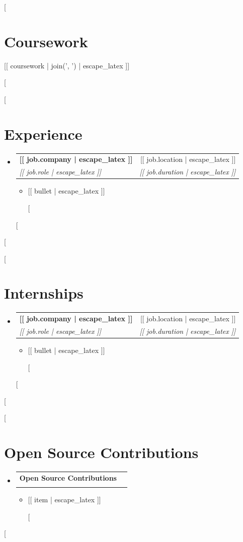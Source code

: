 \documentclass[letterpaper,11pt]{article}
\makeatletter
\newcommand{\resumeItemPlain}[1]{
  \item\small{#1 \vspace{-2pt}}
}
\newcommand{\resumeSubheading}[4]{
  \vspace{-1pt}\item
    \begin{tabular*}{0.97\textwidth}{l@{\extracolsep{\fill}}r}
      \textbf{#1} & #2 \\
      \textit{\small#3} & \textit{\small #4} \\
    \end{tabular*}\vspace{-5pt}
}
\newcommand{\resumeSubHeadingListStart}{\begin{itemize}[leftmargin=*]}
\newcommand{\resumeSubHeadingListEnd}{\end{itemize}}
\newcommand{\resumeItemListStart}{\begin{itemize}}
\newcommand{\resumeItemListEnd}{\end{itemize}\vspace{-5pt}}
\makeatother
\begin{document}
[%
\section{Coursework}
 \begin{itemize}[leftmargin=0.15in, label={}]
    \small{\item{[[ coursework | join(', ') | escape_latex ]]}}
 \end{itemize}
 \vspace{-16pt}
[%

[%
\section{Experience}
  \resumeSubHeadingListStart
    [%
    \resumeSubheading
      {[[ job.company | escape_latex ]]}{[[ job.location | escape_latex ]]}
      {[[ job.role | escape_latex ]]}{[[ job.duration | escape_latex ]]}
      \resumeItemListStart
        [%
        \resumeItemPlain{[[ bullet | escape_latex ]]}
        [%
      \resumeItemListEnd
    [%
  \resumeSubHeadingListEnd
[%

[%
\section{Internships}
  \resumeSubHeadingListStart
    [%
    \resumeSubheading
      {[[ job.company | escape_latex ]]}{[[ job.location | escape_latex ]]}
      {[[ job.role | escape_latex ]]}{[[ job.duration | escape_latex ]]}
      \resumeItemListStart
        [%
        \resumeItemPlain{[[ bullet | escape_latex ]]}
        [%
      \resumeItemListEnd
    [%
  \resumeSubHeadingListEnd
[%

[%
\section{Open Source Contributions}
  \resumeSubHeadingListStart
    \resumeSubheading
      {Open Source Contributions}{}
      {}{}
      \resumeItemListStart
        [%
        \resumeItemPlain{[[ item | escape_latex ]]}
        [%
      \resumeItemListEnd
  \resumeSubHeadingListEnd
[%
\end{document}
